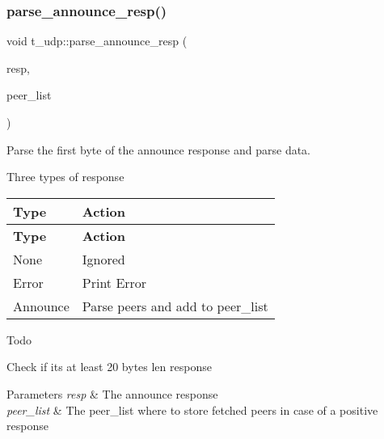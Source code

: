 \subsubsection{\texorpdfstring{parse\+\_\+announce\+\_\+resp()}{parse\_announce\_resp()}}
{\footnotesize\ttfamily void t\+\_\+udp\+::parse\+\_\+announce\+\_\+resp (\begin{DoxyParamCaption}\item[{std\+::vector$<$ uint8\+\_\+t $>$ \&}]{resp,  }\item[{\hyperlink{namespacepwp_ad07fa6df116b205302ad5ec172277184}{pwp\+::\+Peer\+List}}]{peer\+\_\+list }\end{DoxyParamCaption})}



Parse the first byte of the announce response and parse data. 

Three types of response

\tabulinesep=1mm
\begin{longtabu} spread 0pt [c]{*{2}{|X[-1]}|}
\hline
\rowcolor{\tableheadbgcolor}\textbf{ Type }&\textbf{ Action  }\\
\endfirsthead
\hline
\endfoot
\hline
\rowcolor{\tableheadbgcolor}\textbf{ Type }&\textbf{ Action  }\\
\endhead
None &Ignored \\
Error &Print Error \\
Announce &Parse peers and add to peer\+\_\+list \\
\end{longtabu}


\begin{DoxyRefDesc}{Todo}
\item[\hyperlink{todo__todo000007}{Todo}]Check if it\textquotesingle{}s at least 20 bytes len response\end{DoxyRefDesc}



\begin{DoxyParams}{Parameters}
{\em resp} & The announce response \\
\hline
{\em peer\+\_\+list} & The peer\+\_\+list where to store fetched peers in case of a positive response \\
\hline
\end{DoxyParams}
\mbox{\label{namespacet__udp_a42ced8af1acd3fb2bc46358effe48dbc}} 
